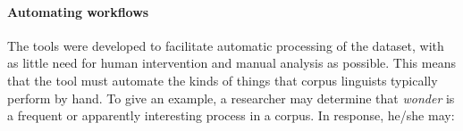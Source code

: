 \paragraph{Automating workflows}

The tools were developed to facilitate automatic processing of the dataset, with as little need for human intervention and manual analysis as possible. This means that the tool must automate the kinds of things that corpus linguists typically perform by hand. To give an example, a researcher may determine that \emph{wonder} is a frequent or apparently interesting process in a \gls{corpus}. In response, he\slash she may:


